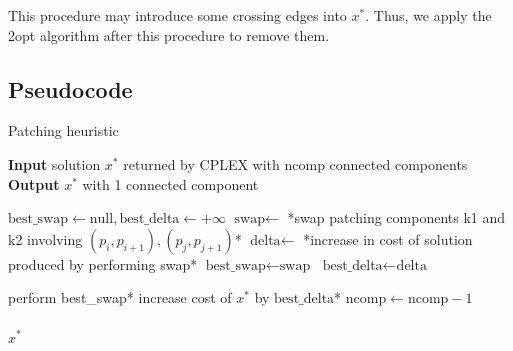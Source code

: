 \begin{figure}[h]
\begin{subfigure}[c]{.4\textwidth}
{
        }
    \end{subfigure}

\end{figure}

This procedure may introduce some crossing edges into $x^*$. Thus, we apply the 2opt algorithm after this procedure to remove them.

\subsection{Pseudocode}
\begin{algorithm}[h]
    \caption{Patching heuristic}
    \textbf{Input} solution $x^*$ returned by CPLEX with ncomp connected components\\
    \textbf{Output} $x^*$ with 1 connected component\\
    \begin{algorithmic}

            \State $\text{best\_swap}\gets\text{null}, \text{best\_delta}\gets+\infty$
                    \State $\text{swap}\gets$ *swap patching components k1 and k2 involving $(p_i,p_{i+1}),(p_j,p_{j+1})$*
                    \State $\text{delta}\gets$ *increase in cost of solution produced by performing swap*
                        \State $\text{best\_swap} \gets \text{swap}$
                        \State $\text{best\_delta} \gets \text{delta}$
                    \EndIf
                \EndFor
            \EndFor

            \State *perform best\_swap*
            \State *increase cost of $x^*$ by $\text{best\_delta}$*
            \State $\text{ncomp} \gets \text{ncomp}-1$
        \EndWhile\\\\

        \Return $x^*$
    \end{algorithmic}
    
\end{algorithm}

